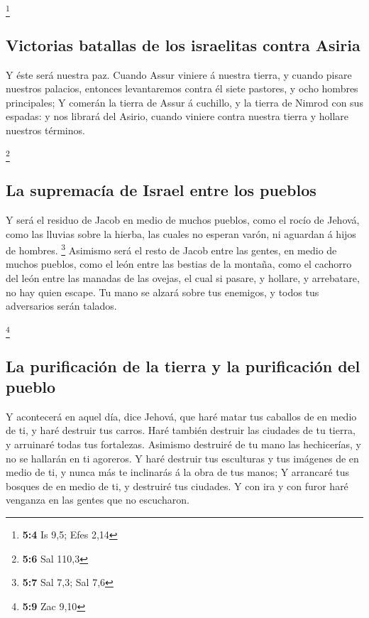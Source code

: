 \footnote{\textbf{5:4} Is 9,5; Efes 2,14}

\hypertarget{victorias-batallas-de-los-israelitas-contra-asiria}{%
\subsection{Victorias batallas de los israelitas contra
Asiria}\label{victorias-batallas-de-los-israelitas-contra-asiria}}

 Y éste será nuestra paz. Cuando Assur viniere á nuestra
tierra, y cuando pisare nuestros palacios, entonces levantaremos contra
él siete pastores, y ocho hombres principales;  Y comerán
la tierra de Assur á cuchillo, y la tierra de Nimrod con sus espadas: y
nos librará del Asirio, cuando viniere contra nuestra tierra y hollare
nuestros términos.

\footnote{\textbf{5:6} Sal 110,3}

\hypertarget{la-supremacuxeda-de-israel-entre-los-pueblos}{%
\subsection{La supremacía de Israel entre los
pueblos}\label{la-supremacuxeda-de-israel-entre-los-pueblos}}

 Y será el residuo de Jacob en medio de muchos pueblos,
como el rocío de Jehová, como las lluvias sobre la hierba, las cuales no
esperan varón, ni aguardan á hijos de hombres. \footnote{\textbf{5:7}
  Sal 7,3; Sal 7,6}  Asimismo será el resto de Jacob entre
las gentes, en medio de muchos pueblos, como el león entre las bestias
de la montaña, como el cachorro del león entre las manadas de las
ovejas, el cual si pasare, y hollare, y arrebatare, no hay quien escape.
 Tu mano se alzará sobre tus enemigos, y todos tus
adversarios serán talados.

\footnote{\textbf{5:9} Zac 9,10}

\hypertarget{la-purificaciuxf3n-de-la-tierra-y-la-purificaciuxf3n-del-pueblo}{%
\subsection{La purificación de la tierra y la purificación del
pueblo}\label{la-purificaciuxf3n-de-la-tierra-y-la-purificaciuxf3n-del-pueblo}}

 Y acontecerá en aquel día, dice Jehová, que haré matar
tus caballos de en medio de ti, y haré destruir tus carros.
 Haré también destruir las ciudades de tu tierra, y
arruinaré todas tus fortalezas.  Asimismo destruiré de tu
mano las hechicerías, y no se hallarán en ti agoreros.  Y
haré destruir tus esculturas y tus imágenes de en medio de ti, y nunca
más te inclinarás á la obra de tus manos;  Y arrancaré
tus bosques de en medio de ti, y destruiré tus ciudades. 
Y con ira y con furor haré venganza en las gentes que no escucharon.


